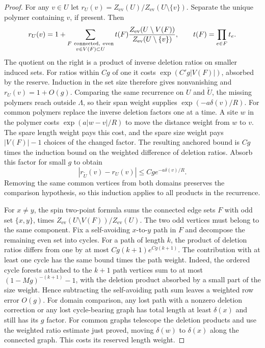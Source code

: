 \documentclass[11pt]{article}
\theoremstyle{definition}
\begin{document}
\begin{proof}
For any \(v\in U\) let
\(r_U(v)=Z_{\mathrm{ev}}(U)/Z_{\mathrm{ev}}(U\setminus\{v\})\).
Separate the unique polymer containing \(v\), if present. Then
\begin{equation}
 r_U(v)=1+
   \sum_{\substack{F\ {\rm connected,\ even}\\v\in V(F)\subset U}}
      t(F)\frac{Z_{\mathrm{ev}}(U\setminus V(F))}
                 {Z_{\mathrm{ev}}(U\setminus\{v\})},
 \qquad t(F)=\prod_{e\in F}t_e .
\end{equation}
The quotient on the right is a product of inverse deletion
ratios on smaller induced sets. For ratios within \(Cg\) of
one it costs \(\exp(C'g|V(F)|)\), absorbed by the reserve.
Induction in the set size therefore gives nonvanishing and
\(r_U(v)=1+O(g)\). Comparing the same recurrence on \(U\) and
\(\widetilde U\), the missing polymers reach outside \(\Lambda\),
so their span weight supplies \(\exp(-a\delta(v)/R)\).
For common polymers replace the inverse deletion factors one
at a time. A site \(w\) in the polymer costs
\(\exp(a|w-v|/R)\) to move the distance weight from \(w\) to \(v\).
The spare length weight pays this cost, and the spare size weight
pays \(|V(F)|-1\) choices of the changed factor. The resulting
anchored bound is \(Cg\) times the induction bound on the
weighted difference of deletion ratios. Absorb this factor
for small \(g\) to obtain
\begin{equation}
 |r_{\widetilde U}(v)-r_U(v)|\le Cg e^{-a\delta(v)/R}.
\end{equation}
Removing the same common vertices from both domains preserves
the comparison hypothesis, so this induction applies to all
products in the recurrence.

For \(x\ne y\), the spin two-point formula sums the connected
edge sets \(F\) with odd set \(\{x,y\}\), times
\(Z_{\mathrm{ev}}(U\setminus V(F))/Z_{\mathrm{ev}}(U)\). The two
odd vertices must belong to the same component. Fix a
self-avoiding \(x\)-to-\(y\) path in \(F\) and decompose the
remaining even set into cycles. For a path of length \(k\),
the product of deletion ratios differs from one by at most
\(Cg(k+1)e^{Cg(k+1)}\). The contribution with at least one
cycle has the same bound times the path weight. Indeed,
the ordered cycle forests attached to the \(k+1\) path
vertices sum to at most
\((1-Mg)^{-(k+1)}-1\), with the deletion product absorbed by
a small part of the size weight. Hence subtracting the
self-avoiding path sum leaves a weighted row error \(O(g)\).
For domain comparison, any lost path with a nonzero
deletion correction or any lost cycle-bearing graph has
total length at least \(\delta(x)\) and still has its
\(g\) factor. For common graphs telescope the deletion
products and use the weighted ratio estimate just proved,
moving \(\delta(w)\) to \(\delta(x)\) along the connected
graph. This costs its reserved length weight.


\end{proof}
\end{document}
